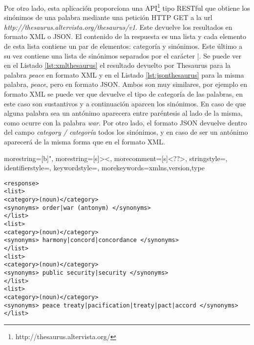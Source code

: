 Por otro lado, esta aplicación proporciona una API\footnote{http://thesaurus.altervista.org/} tipo RESTful que obtiene los sinónimos de una palabra mediante una petición HTTP GET a la url \textit{http://thesaurus.altervista.org/thesaurus/v1}. 
Este devuelve los resultados en formato XML o JSON. El contenido de la respuesta es una lista y cada elemento de esta lista contiene un par de elementos: categoría y sinónimos. Este último a su vez contiene una lista de sinónimos separados por el carácter |. 
Se puede ver en el Listado \ref{lst:xmlthesaurus} el resultado devuelto por Thesaurus para la palabra \textit{peace} en formato XML y en el Listado \ref{lst:jsonthesaurus} para la misma palabra, \textit{peace}, pero en formato JSON.
Ambos son muy similares, por ejemplo en formato XML se puede ver que devuelve el tipo de categoría de las palabras, en este caso son sustantivos y a continuación aparcen los sinónimos. En caso de que alguna palabra sea un antónimo aparecera entre paréntesis al lado de la misma, como ocurre con la palabra \textit{war}. Por otro lado, el formato JSON devuelve dentro del campo \textit{category / categoría} todos los sinónimos, y en caso de ser un antónimo aparecerá de la misma forma que en el formato XML.





{
	morestring=[b]",
	morestring=[s]{>}{<},
	morecomment=[s]{<?}{?>},
	stringstyle=\color{black},
	identifierstyle=\color{darkblue},
	keywordstyle=\color{cyan},
	morekeywords={xmlns,version,type}%
}



\lstset{language=XML}
\begin{lstlisting}[caption= XML devuelto por Thesaurus para la palabra \textit{peace}, label={lst:xmlthesaurus}, frame=single]
<response> 
<list>
<category>(noun)</category> 
<synonyms> order|war (antonym) </synonyms>
</list>
<list>
<category>(noun)</category> 
<synonyms> harmony|concord|concordance </synonyms>
</list>
<list>
<category>(noun)</category> 
<synonyms> public security|security </synonyms>
</list>
<list>
<category>(noun)</category> 
<synonyms> peace treaty|pacification|treaty|pact|accord </synonyms>
</list>
\end{lstlisting}





